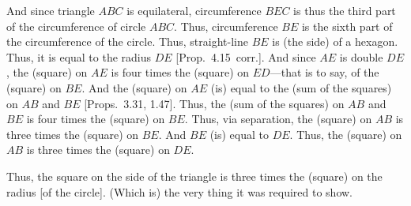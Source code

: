 \begin{Parallel}{}{}
{And since triangle $ABC$ is equilateral, circumference $BEC$ is thus the
third part of the circumference of circle $ABC$. Thus, 
circumference $BE$ is the sixth part of the circumference of the circle. 
Thus, straight-line $BE$ is (the side) of a hexagon. Thus, it is equal to the radius
$DE$ [Prop.~4.15~corr.]. And since $AE$ is double $DE$, the (square)
on $AE$ is four times the (square) on $ED$---that is to say, of the
(square) on $BE$.  And the (square) on $AE$ (is) equal to
the (sum of the squares) on $AB$ and $BE$ [Props.~3.31, 1.47]. 
Thus, the (sum of the squares) on $AB$ and $BE$ is four times the
(square) on $BE$. Thus, via separation, the (square) on $AB$ is three
times the (square) on $BE$. And $BE$ (is) equal to $DE$. Thus, the
(square) on $AB$ is three times the (square) on $DE$.

Thus, the square on the side of the triangle is three times the (square)
on the radius [of the circle]. (Which is) the very thing it was required to show.}
\end{Parallel}

